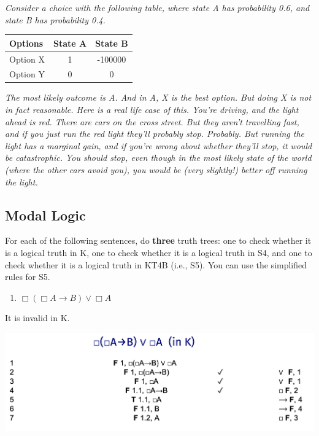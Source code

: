 \documentclass[
  11pt,
]{article}
\providecommand{\tightlist}{%
  \setlength{\itemsep}{0pt}\setlength{\parskip}{0pt}}
\begin{document}
\emph{Consider a choice with the following table, where state A has
probability 0.6, and state B has probability 0.4.}

\begin{longtable}[]{@{}lcc@{}}
\toprule
Options & State A & State B \\
\midrule
\endhead
Option X & 1 & -100000 \\
Option Y & 0 & 0 \\
\bottomrule
\end{longtable}

\emph{The most likely outcome is A. And in A, X is the best option. But
doing X is not in fact reasonable. Here is a real life case of this.
You're driving, and the light ahead is red. There are cars on the cross
street. But they aren't travelling fast, and if you just run the red
light they'll probably stop. Probably. But running the light has a
marginal gain, and if you're wrong about whether they'll stop, it would
be catastrophic. You should stop, even though in the most likely state
of the world (where the other cars avoid you), you would be (very
slightly!) better off running the light.}

\hypertarget{modal-logic}{%
\subsection{Modal Logic}\label{modal-logic}}

For each of the following sentences, do \textbf{three} truth trees: one
to check whether it is a logical truth in K, one to check whether it is
a logical truth in S4, and one to check whether it is a logical truth in
KT4B (i.e., S5). You can use the simplified rules for S5.

\begin{enumerate}
\def\labelenumi{\arabic{enumi}.}
\setcounter{enumi}{14}
\tightlist
\item
  \(\Box(\Box A \rightarrow B) \vee \Box A\)
\end{enumerate}

It is invalid in K.

\includegraphics{q15a.png}
\end{document}
